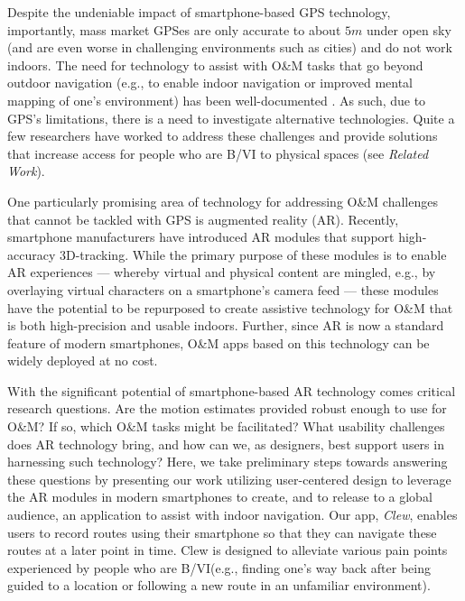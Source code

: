 \documentclass[chi]{sigchi}
\newcommand{\BVI}{B/VI\xspace}
\newcommand{\OM}{O\&M\xspace}
\begin{document}
Despite the undeniable impact of smartphone-based GPS technology, importantly, mass market GPSes are only accurate to about $5m$ under open sky (and are even worse in challenging environments such as cities) and do not work indoors.  The need for technology to assist with \OM tasks that go beyond outdoor navigation (e.g., to enable indoor navigation or improved mental mapping of one's environment) has been well-documented \cite{long1997establishing}.  As such, due to GPS's limitations, there is a need to investigate alternative technologies.  Quite a few researchers have worked to address these challenges and provide solutions that increase access for people who are \BVI to physical spaces (see \emph{Related Work}).

One particularly promising area of technology for addressing \OM challenges that cannot be tackled with GPS is augmented reality (AR).  Recently, smartphone manufacturers have introduced AR modules that support high-accuracy 3D-tracking.  While the primary purpose of these modules is to enable AR experiences --- whereby virtual and physical content are mingled, e.g., by overlaying virtual characters on a smartphone's camera feed --- these modules have the potential to be repurposed to create assistive technology for \OM that is both high-precision and usable indoors.  Further, since AR is now a standard feature of modern smartphones, \OM apps based on this technology can be widely deployed at no cost.

With the significant potential of smartphone-based AR technology comes critical research questions.  Are the motion estimates provided robust enough to use for \OM? If so, which \OM tasks might be facilitated?  What usability challenges does AR technology bring, and how can we, as designers, best support users in harnessing such technology?  Here, we take preliminary steps towards answering these questions by presenting our work utilizing user-centered design to leverage the AR modules in modern smartphones to create, and to release to a global audience, an application to assist with indoor navigation.  Our app, \emph{Clew}, enables users to record routes using their smartphone so that they can navigate these routes at a later point in time.  Clew is designed to alleviate various pain points experienced by people who are \BVI (e.g., finding one's way back after being guided to a location or following a new route in an unfamiliar environment).%
\end{document}
